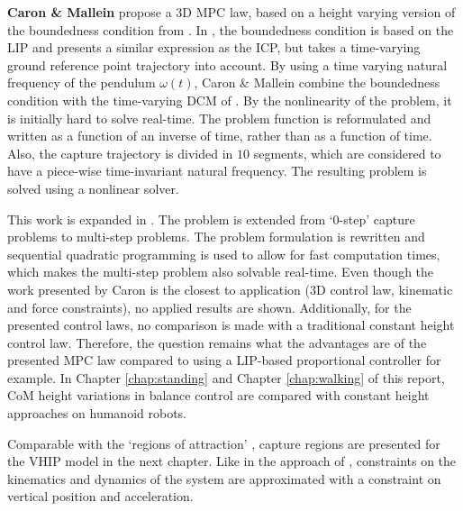 \textbf{Caron \& Mallein} \cite{caron2018balance} propose a \ac{3D} \ac{MPC} law, based on a height varying version of the boundedness condition from \cite{lanari2014boundedness}. In \cite{lanari2014boundedness}, the boundedness condition is based on the \ac{LIP} and presents a similar expression as the \ac{ICP}, but takes a time-varying ground reference point trajectory into account.  By using a time varying natural frequency of the pendulum $\omega(t)$, Caron \& Mallein \cite{caron2018balance} combine the boundedness condition with the time-varying \ac{DCM} of \cite{hopkins2014humanoid}. By the nonlinearity of the problem, it is initially hard to solve real-time. The problem function is reformulated and written as a function of an inverse of time, rather than as a function of time. Also, the capture trajectory is divided in $10$ segments, which are considered to have a piece-wise time-invariant natural frequency. The resulting problem is solved using a nonlinear solver.

This work is expanded in \cite{caron2018capturability}. The problem is extended from `0-step' capture problems to multi-step problems. The problem formulation is rewritten and sequential quadratic programming is used to allow for fast computation times, which makes the multi-step problem also solvable real-time. Even though the work presented by Caron is the closest to application (\ac{3D} control law, kinematic and force constraints), no applied results are shown. Additionally, for the presented control laws, no comparison is made with a traditional constant height control law. Therefore, the question remains what the advantages are of the presented \ac{MPC} law compared to using a \ac{LIP}-based proportional controller for example. In Chapter \ref{chap:standing} and Chapter \ref{chap:walking} of this report, \ac{CoM} height variations in balance control are compared with constant height approaches on humanoid robots.

Comparable with the `regions of attraction' \cite{koolen2016balance}, capture regions are presented for the \ac{VHIP} model in the next chapter. Like in the approach of \cite{caron2018balance,caron2018capturability}, constraints on the kinematics and dynamics of the system are approximated with a constraint on vertical position and acceleration.